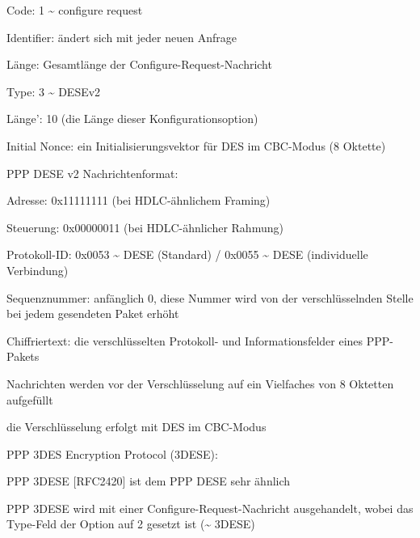 \documentclass[a4paper]{article}
\begin{document}
\begin{multicols}{3}
\begin{itemize*}
\begin{itemize*}
                  \begin{itemize*} \item Code: 1 \textasciitilde{} configure request \item Identifier: ändert sich mit jeder neuen Anfrage \item Länge: Gesamtlänge der Configure-Request-Nachricht \item Type: 3 \textasciitilde{} DESEv2 \item Länge': 10 (die Länge dieser Konfigurationsoption) \item Initial Nonce: ein Initialisierungsvektor für DES im CBC-Modus (8 Oktette) \end{itemize*}
            \end{itemize*}
            \item PPP DESE v2 Nachrichtenformat:
            \begin{itemize*}
                  \item Adresse: 0x11111111 (bei HDLC-ähnlichem Framing)
                  \item Steuerung: 0x00000011 (bei HDLC-ähnlicher Rahmung)
                  \item Protokoll-ID: 0x0053 \textasciitilde{} DESE (Standard) / 0x0055 \textasciitilde{} DESE (individuelle Verbindung)
                  \item Sequenznummer: anfänglich 0, diese Nummer wird von der verschlüsselnden Stelle bei jedem gesendeten Paket erhöht
                  \item Chiffriertext: die verschlüsselten Protokoll- und Informationsfelder eines PPP-Pakets
                  \begin{itemize*} \item Nachrichten werden vor der Verschlüsselung auf ein Vielfaches von 8 Oktetten aufgefüllt \item die Verschlüsselung erfolgt mit DES im CBC-Modus \end{itemize*}
            \end{itemize*}
            \item PPP 3DES Encryption Protocol (3DESE):
            \begin{itemize*}
                  \item PPP 3DESE {[}RFC2420{]} ist dem PPP DESE sehr ähnlich
                  \item PPP 3DESE wird mit einer Configure-Request-Nachricht ausgehandelt, wobei das Type-Feld der Option auf 2 gesetzt ist (\textasciitilde{} 3DESE)

\end{itemize*}
\end{itemize*}
\end{multicols}
\end{document}
